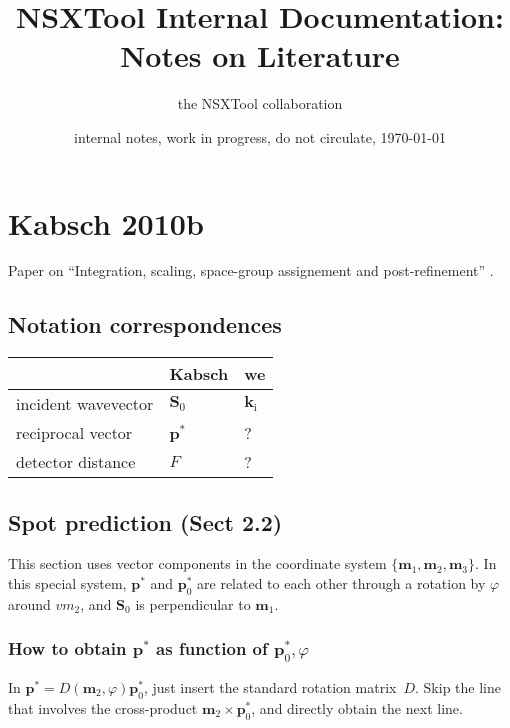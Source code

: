 \documentclass[twocolumn,preprintnumbers,amsmath,amssymb]{revtex4}
\def\v#1{\mathbf{#1}}
\begin{document}
\title{NSXTool Internal Documentation: Notes on Literature}
\author{the NSXTool collaboration}

\date{internal notes, work in progress, do not circulate, \today}


\maketitle

\section{Kabsch 2010b}

Paper on ``Integration, scaling, space-group assignement and post-refinement'' \cite{Kab10b}.

\subsection{Notation correspondences}

\begin{tabular}{lll}
&Kabsch &we\\\hline
incident wavevector &$\v{S}_0$ &$\v{k}_\text{i}$\\
reciprocal vector &$\v{p^*}$ &?\\
detector distance &$F$ &?\\
\end{tabular}

\subsection{Spot prediction (Sect 2.2)}

This section uses vector components in the coordinate system $\{\v{m}_1,\v{m}_2,\v{m}_3\}$.
In this special system,
$\v{p}^*$ and $\v{p}^*_0$ are related to each other
through a rotation by $\varphi$ around $v{m}_2$,
and $\v{S}_0$ is perpendicular to $\v{m}_1$.

\subsubsection{How to obtain $\v{p}^*$ as function of $\v{p}^*_0,\varphi$}

In $\v{p}^*=D(\v{m}_2,\varphi)\v{p}^*_0$, just insert the standard rotation matrix~$D$.
Skip the line that involves the cross-product $\v{m}_2\times\v{p}^*_0$,
and directly obtain the next line.
\end{document}
